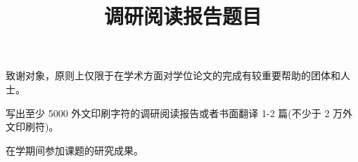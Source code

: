 \documentclass[degree=bachelor]{thuthesis}
\begin{document}
\begin{acknowledgements}
  致谢对象，原则上仅限于在学术方面对学位论文的完成有较重要帮助的团体和人士。
\end{acknowledgements}


\statement


\appendix
\begin{survey}

\title{调研阅读报告题目}
\maketitle

写出至少 5000 外文印刷字符的调研阅读报告或者书面翻译 1-2 篇(不少于 2 万外文印刷符)。

\end{survey}


\begin{resume}
  在学期间参加课题的研究成果。
\end{resume}


\clearpage
\OMIT
\end{document}
